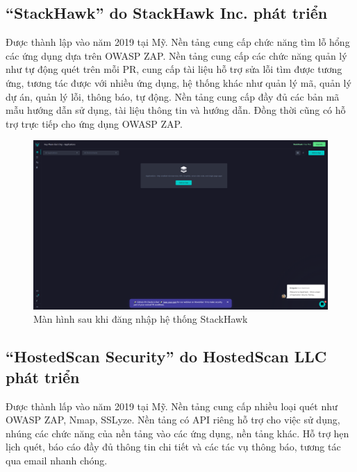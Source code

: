 \subsection{“StackHawk” do StackHawk Inc. phát triển}

\tab Được thành lập vào năm 2019 tại Mỹ.
Nền tảng cung cấp chức năng tìm lỗ hổng các ứng dụng dựa trên OWASP ZAP.
Nền tảng cung cấp các chức năng quản lý như tự động quét trên mỗi PR, cung cấp tài liệu hỗ trợ sửa lỗi tìm được tương ứng, tương tác được với nhiều ứng dụng, hệ thống khác như quản lý mã, quản lý dự án, quản lý lỗi, thông báo, tự động.
Nền tảng cung cấp đầy đủ các bản mã mẫu hướng dẫn sử dụng, tài liệu thông tin và hướng dẫn.
Đồng thời cũng có hỗ trợ trực tiếp cho ứng dụng OWASP ZAP.

\begin{figure}[H]
    \centering
    \includegraphics[width=\textwidth]{applied-thesis-chapters/chapter-1/app.stackhawk.com_applications.png}
    \caption{Màn hình sau khi đăng nhập hệ thống StackHawk}
\end{figure}

\subsection{“HostedScan Security” do HostedScan LLC phát triển}

\tab Được thành lấp vào năm 2019 tại Mỹ.
Nền tảng cung cấp nhiều loại quét như OWASP ZAP, Nmap, SSLyze.
Nền tảng có API riêng hỗ trợ cho việc sử dụng, nhúng các chức năng của nền tảng vào các ứng dụng, nền tảng khác.
Hỗ trợ hẹn lịch quét, báo cáo đầy đủ thông tin chi tiết và các tác vụ thông báo, tương tác qua email nhanh chóng.

